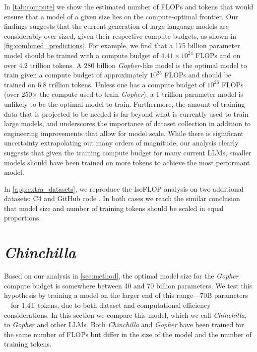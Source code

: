 In \autoref{tab:compute} we show the estimated number of FLOPs and tokens that would ensure that a model of a given size lies on the compute-optimal frontier. Our findings suggests that the current generation of large language models are considerably over-sized, given their respective compute budgets, as shown in \autoref{fig:combined_predictions}.
For example, we find that a 175 billion parameter model should be trained with a compute budget of $4.41\times 10^{24}$ FLOPs and on over 4.2 trillion tokens. A 280 billion \textit{Gopher}-like model is the optimal model to train given a compute budget of approximately $10^{25}$ FLOPs and should be trained on 6.8 trillion tokens. Unless one has a compute budget of $10^{26}$ FLOPs (over 250$\times$ the compute used to train \textit{Gopher}), a 1 trillion parameter model is unlikely to be the optimal model to train. Furthermore, the amount of training data that is projected to be needed is far beyond what is currently used to train large models, and underscores the importance of dataset collection in addition to engineering improvements that allow for model scale. While there is significant uncertainty extrapolating out many orders of magnitude, our analysis clearly suggests that given the training compute budget for many current LLMs, smaller models should have been trained on more tokens to achieve the most performant model. 

In \autoref{app:extra_datasets}, we reproduce the IsoFLOP analysis on two additional datasets: C4 \citep{raffel2019exploring} and GitHub code \citep{rae2021gopher}. In both cases we reach the similar conclusion that model size and number of training tokens should be scaled in equal proportions.

\section{\textit{Chinchilla}}
Based on our analysis in \autoref{sec:method}, the optimal model size for the \textit{Gopher} compute budget is somewhere between 40 and 70 billion parameters. We test this hypothesis by training a model on the larger end of this range---70B parameters---for 1.4T tokens, due to both dataset and computational efficiency considerations. In this section we compare this model, which we call \textit{Chinchilla}, to \textit{Gopher} and other LLMs. Both \textit{Chinchilla} and \textit{Gopher} have been trained for the same number of FLOPs but differ in the size of the model and the number of training tokens.

